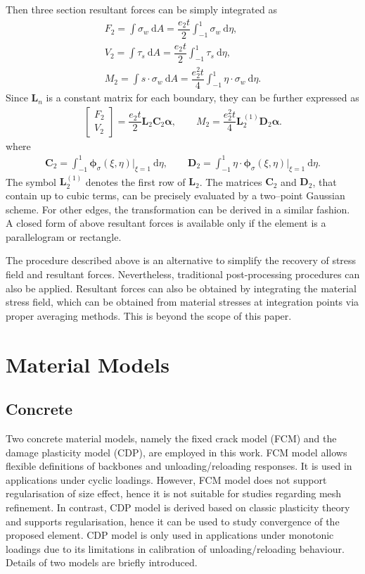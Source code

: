 \documentclass[3p,review,sort&compress,11pt,fleqn]{elsarticle}
\newcommand*{\md}[1]{\mathrm{d}#1}
\newcommand*{\mathbold}{\bm}
\begin{document}
Then three section resultant forces can be simply integrated as
\begin{gather*}
F_2=\int\sigma_w~\md{A}=\dfrac{e_2t}{2}\int_{-1}^{1}\sigma_w~\md{\eta},\\
V_2=\int\tau_s~\md{A}=\dfrac{e_2t}{2}\int_{-1}^{1}\tau_s~\md{\eta},\\
M_2=\int{}s\cdot\sigma_w~\md{A}=\dfrac{e_2^2t}{4}\int_{-1}^{1}\eta\cdot\sigma_w~\md{\eta}.
\end{gather*}
Since $\mathbold{L}_n$ is a constant matrix for each boundary, they can be further expressed as
\begin{gather}
\begin{bmatrix}
F_2\\V_2
\end{bmatrix}=\dfrac{e_2t}{2}\mathbold{L}_2\mathbold{C}_2\mathbold{\alpha},\qquad
M_2=\dfrac{e_2^2t}{4}\mathbold{L}_2^{\left(1\right)}\mathbold{D}_2\mathbold{\alpha}.
\end{gather}
where
\begin{gather}
\mathbold{C}_2=\int_{-1}^{1}\mathbold{\phi}_\sigma\left(\xi,\eta\right)\Big|_{\xi=1}~\md{\eta},\qquad
\mathbold{D}_2=\int_{-1}^{1}\eta\cdot\mathbold{\phi}_\sigma\left(\xi,\eta\right)\Big|_{\xi=1}~\md{\eta}.
\end{gather}
The symbol $\mathbold{L}_2^{\left(1\right)}$ denotes the first row of $\mathbold{L}_2$. The matrices $\mathbold{C}_2$ and $\mathbold{D}_2$, that contain up to cubic terms, can be precisely evaluated by a two--point Gaussian scheme. For other edges, the transformation can be derived in a similar fashion. A closed form of above resultant forces is available only if the element is a parallelogram or rectangle.

The procedure described above is an alternative to simplify the recovery of stress field and resultant forces. Nevertheless, traditional post-processing procedures can also be applied. Resultant forces can also be obtained by integrating the material stress field, which can be obtained from material stresses at integration points via proper averaging methods. This is beyond the scope of this paper.
\section{Material Models}
\subsection{Concrete}
Two concrete material models, namely the fixed crack model (FCM) and the damage plasticity model (CDP), are employed in this work. FCM model allows flexible definitions of backbones and unloading/reloading responses. It is used in applications under cyclic loadings. However, FCM model does not support regularisation of size effect, hence it is not suitable for studies regarding mesh refinement. In contrast, CDP model is derived based on classic plasticity theory and supports regularisation, hence it can be used to study convergence of the proposed element. CDP model is only used in applications under monotonic loadings due to its limitations in calibration of unloading/reloading behaviour. Details of two models are briefly introduced.
\end{document}
